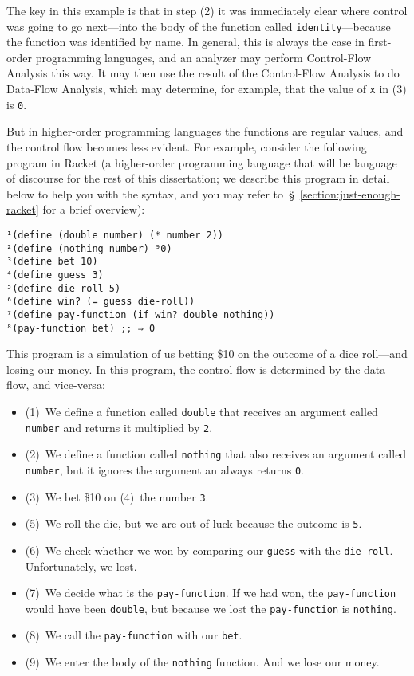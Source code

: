 \documentclass[12pt, oneside]{book}
\begin{document}
The key in this example is that in step (2) it was immediately clear where control was going to go next—into the body of the function called \texttt{identity}—because the function was identified by name. In general, this is always the case in first-order programming languages, and an analyzer may perform Control-Flow Analysis this way. It may then use the result of the Control-Flow Analysis to do Data-Flow Analysis, which may determine, for example, that the value of \texttt{x} in (3) is \texttt{0}.

But in higher-order programming languages the functions are regular values, and the control flow becomes less evident. For example, consider the following program in Racket (a higher-order programming language that will be language of discourse for the rest of this dissertation; we describe this program in detail below to help you with the syntax, and you may refer to~§~\ref{section:just-enough-racket} for a brief overview):

\begin{Verbatim}
¹(define (double number) (* number 2))
²(define (nothing number) ⁹0)
³(define bet 10)
⁴(define guess 3)
⁵(define die-roll 5)
⁶(define win? (= guess die-roll))
⁷(define pay-function (if win? double nothing))
⁸(pay-function bet) ;; ⇒ 0
\end{Verbatim}

This program is a simulation of us betting \$10 on the outcome of a dice roll—and losing our money. In this program, the control flow is determined by the data flow, and vice-versa:

\begin{itemize}
  \item (1)~We define a function called \texttt{double} that receives an argument called \texttt{number} and returns it multiplied by \texttt{2}.
  \item (2)~We define a function called \texttt{nothing} that also receives an argument called \texttt{number}, but it ignores the argument an always returns \texttt{0}.
  \item (3)~We bet \$10 on (4)~the number \texttt{3}.
  \item (5)~We roll the die, but we are out of luck because the outcome is \texttt{5}.
  \item (6)~We check whether we won by comparing our \texttt{guess} with the \texttt{die-roll}. Unfortunately, we lost.
  \item (7)~We decide what is the \texttt{pay-function}. If we had won, the \texttt{pay-function} would have been \texttt{double}, but because we lost the \texttt{pay-function} is \texttt{nothing}.
  \item (8)~We call the \texttt{pay-function} with our \texttt{bet}.
  \item (9)~We enter the body of the \texttt{nothing} function. And we lose our money.
\end{itemize}
\end{document}
